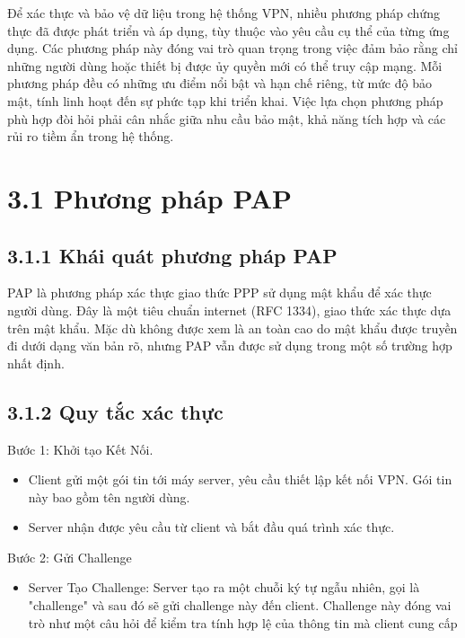 \vspace{-0.5cm}

Để xác thực và bảo vệ dữ liệu trong hệ thống VPN, nhiều phương pháp chứng thực đã được phát triển và áp dụng, tùy thuộc vào yêu cầu cụ thể của từng ứng dụng. Các phương pháp này đóng vai trò quan trọng trong việc đảm bảo rằng chỉ những người dùng hoặc thiết bị được ủy quyền mới có thể truy cập mạng. Mỗi phương pháp đều có những ưu điểm nổi bật và hạn chế riêng, từ mức độ bảo mật, tính linh hoạt đến sự phức tạp khi triển khai. Việc lựa chọn phương pháp phù hợp đòi hỏi phải cân nhắc giữa nhu cầu bảo mật, khả năng tích hợp và các rủi ro tiềm ẩn trong hệ thống.
 
\section*{3.1 Phương pháp PAP}
 \subsection*{3.1.1 Khái quát phương pháp PAP}

PAP là phương pháp xác thực giao thức PPP sử dụng mật khẩu để xác thực người dùng. Đây là một tiêu chuẩn internet (RFC 1334), giao thức xác thực dựa trên mật khẩu. Mặc dù không được xem là an toàn cao do mật khẩu được truyền đi dưới dạng văn bản rõ, nhưng PAP vẫn được sử dụng trong một số trường hợp nhất định.

 \subsection*{3.1.2 Quy tắc xác thực}

Bước 1: Khởi tạo Kết Nối.
    \begin{itemize}[left=1.5cm]
        \item Client gửi một gói tin tới máy server, yêu cầu thiết lập kết nối VPN. Gói tin này bao gồm tên người dùng.
        \item Server nhận được yêu cầu từ client và bắt đầu quá trình xác thực.
    \end{itemize}
    
Bước 2: Gửi Challenge

\begin{itemize}[left=1.5cm]
        \item Server Tạo Challenge: Server tạo ra một chuỗi ký tự ngẫu nhiên, gọi là "challenge" và sau đó sẽ gửi challenge này đến client. Challenge này đóng vai trò như một câu hỏi để kiểm tra tính hợp lệ của thông tin mà client cung cấp
    \end{itemize}
    
